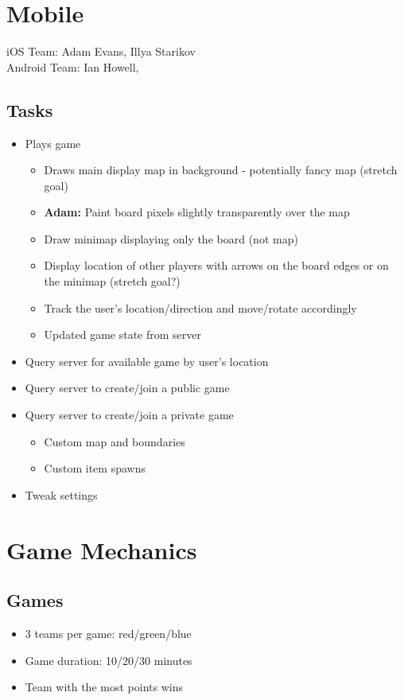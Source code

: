 \documentclass{article}
\begin{document}
\newpage
\section{Mobile}
iOS Team: Adam Evans, Illya Starikov\\
Android Team: Ian Howell, 
\subsection{Tasks}
\begin{itemize}
\item Plays game
	\begin{itemize}
	\item Draws main display map in background - potentially fancy map (stretch goal)
    \item \textbf{Adam:} Paint board pixels slightly transparently over the map
    \item  Draw minimap displaying only the board (not map)
    \item Display location of other players with arrows on the board edges or on the minimap (stretch goal?)
    \item Track the user's location/direction and move/rotate accordingly
    \item Updated game state from server
	\end{itemize}
\item Query server for available game by user's location
\item Query server to create/join a public game
\item Query server to create/join a private game
	\begin{itemize}
	\item Custom map and boundaries
    \item Custom item spawns
	\end{itemize}
\item Tweak settings
\end{itemize}

\newpage
\section{Game Mechanics}

\subsection{Games}
\begin{itemize}
\item 3 teams per game: red/green/blue
\item Game duration: 10/20/30 minutes
\item Team with the most points wins
\end{itemize}
\end{document}
